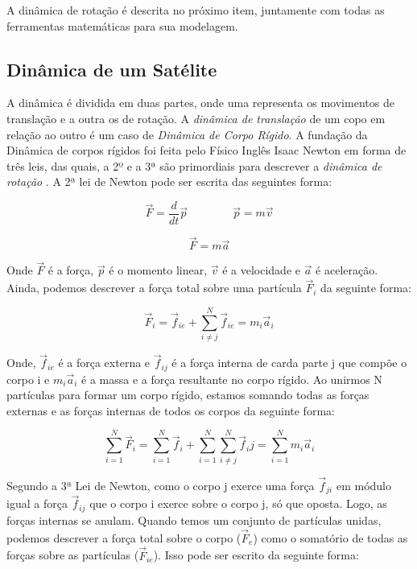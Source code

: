 A dinâmica de rotação é descrita no próximo item, juntamente com todas as ferramentas matemáticas para sua modelagem. 


\subsection{Dinâmica de um Satélite}\label{cap:dinamica}

A dinâmica é dividida em duas partes, onde uma representa os movimentos de translação e a outra os de rotação. A \textit{dinâmica de translação} de um copo em relação ao outro é um caso de \textit{Dinâmica de Corpo Rígido}. A fundação da Dinâmica de corpos rígidos foi feita pelo Físico Inglês Isaac Newton em forma de três leis, das quais, a 2º e a 3ª são primordiais para descrever a \textit{dinâmica de rotação} \cite{Snider}. A 2ª lei de Newton pode ser escrita das seguintes forma:

\begin{equation}\label{eq:fma}
  \vec{F}=\frac{d}{dt}\vec{p}\quad\quad\quad\quad\vec{p}=m\vec{v}
\end{equation}

\begin{equation}
  \vec{F}=m\vec{a}
\end{equation}

Onde $\vec{F}$ é a força, $\vec{p}$ é o momento linear, $\vec{v}$ é a velocidade e $\vec{a}$ é  aceleração. Ainda, podemos descrever a força total sobre uma partícula $\vec{F}_i$ da seguinte forma:

\begin{equation}\label{eq:Fi}
\vec{F}_i=\vec{f}_{ie}+\sum_{i\neq j}^{N}{\vec{f}_{ie}} = m_i\vec{a}_i
\end{equation}
 
 Onde, $\vec{f}_{ie}$ é a força externa e $\vec{f}_{ij}$ é a força interna de carda parte j que compõe o corpo i e $m_i\vec{a}_i$ é a massa e a força resultante no corpo rígido. Ao unirmos N partículas para formar um corpo rígido, estamos somando todas as forças externas e as forças internas de todos os corpos da seguinte forma:

\begin{equation}
  \sum_{i=1}^{N}{\vec{F}_i}=\sum_{i=1}^{N}{\vec{f}_i}+\sum_{i=1}^{N}{\sum_{i\neq j}^{N}{\vec{f}_ij=}}\sum_{i=1}^{N}{m_i\vec{a}_i} 
\end{equation}

Segundo a 3ª Lei de Newton, como o corpo j exerce uma força $\vec{f}_{ji}$ em módulo igual a força $\vec{f}_{ij}$ que o corpo i exerce sobre o corpo j, só que oposta. Logo, as forças internas se anulam. Quando temos um conjunto de partículas unidas, podemos descrever a força total sobre o corpo ($\vec{F}_e$) como o somatório de todas as forças sobre as partículas ($\vec{F}_{ie}$). Isso pode ser escrito da seguinte forma:

